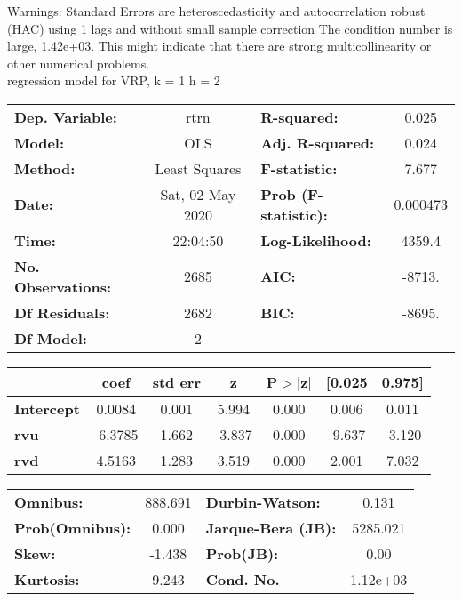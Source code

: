 Warnings: \newline
 [1] Standard Errors are heteroscedasticity and autocorrelation robust (HAC) using 1 lags and without small sample correction \newline
 [2] The condition number is large, 1.42e+03. This might indicate that there are \newline
 strong multicollinearity or other numerical problems.\\ 

regression model for VRP, k = 1 h = 2\begin{center}
\begin{tabular}{lclc}
\toprule
\textbf{Dep. Variable:}    &       rtrn       & \textbf{  R-squared:         } &     0.025   \\
\textbf{Model:}            &       OLS        & \textbf{  Adj. R-squared:    } &     0.024   \\
\textbf{Method:}           &  Least Squares   & \textbf{  F-statistic:       } &     7.677   \\
\textbf{Date:}             & Sat, 02 May 2020 & \textbf{  Prob (F-statistic):} &  0.000473   \\
\textbf{Time:}             &     22:04:50     & \textbf{  Log-Likelihood:    } &    4359.4   \\
\textbf{No. Observations:} &        2685      & \textbf{  AIC:               } &    -8713.   \\
\textbf{Df Residuals:}     &        2682      & \textbf{  BIC:               } &    -8695.   \\
\textbf{Df Model:}         &           2      & \textbf{                     } &             \\
\bottomrule
\end{tabular}
\begin{tabular}{lcccccc}
                   & \textbf{coef} & \textbf{std err} & \textbf{z} & \textbf{P$> |$z$|$} & \textbf{[0.025} & \textbf{0.975]}  \\
\midrule
\textbf{Intercept} &       0.0084  &        0.001     &     5.994  &         0.000        &        0.006    &        0.011     \\
\textbf{rvu}       &      -6.3785  &        1.662     &    -3.837  &         0.000        &       -9.637    &       -3.120     \\
\textbf{rvd}       &       4.5163  &        1.283     &     3.519  &         0.000        &        2.001    &        7.032     \\
\bottomrule
\end{tabular}
\begin{tabular}{lclc}
\textbf{Omnibus:}       & 888.691 & \textbf{  Durbin-Watson:     } &    0.131  \\
\textbf{Prob(Omnibus):} &   0.000 & \textbf{  Jarque-Bera (JB):  } & 5285.021  \\
\textbf{Skew:}          &  -1.438 & \textbf{  Prob(JB):          } &     0.00  \\
\textbf{Kurtosis:}      &   9.243 & \textbf{  Cond. No.          } & 1.12e+03  \\
\bottomrule
\end{tabular}
\end{center}

